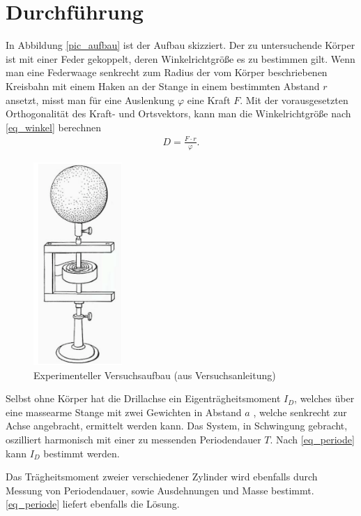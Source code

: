 \section{Durchführung}
In Abbildung \eqref{pic_aufbau} ist der Aufbau skizziert. Der zu untersuchende Körper ist mit einer Feder gekoppelt, deren Winkelrichtgröße
es zu bestimmen gilt. Wenn man eine Federwaage senkrecht zum Radius der vom Körper beschriebenen Kreisbahn mit einem Haken an der Stange
in einem bestimmten Abstand $r$ ansetzt, misst man für eine Auslenkung $\varphi$ eine Kraft $F$. Mit der vorausgesetzten Orthogonalität
des Kraft- und Ortsvektors, kann man die Winkelrichtgröße nach \eqref{eq_winkel} berechnen
\begin{align}
 D = \frac{F\cdot r}{\varphi}.
\end{align}

\begin{figure}[H]
 \includegraphics[width=0.3\textwidth]{pics/aufbau.png}
 \caption{Experimenteller Versuchsaufbau (aus Versuchsanleitung)}
 \label{pic_aufbau}
\end{figure}

Selbst ohne Körper hat die Drillachse ein Eigenträgheitsmoment $I_D$, welches über eine massearme Stange mit zwei Gewichten in Abstand $a$
, welche senkrecht zur Achse angebracht, ermittelt werden kann. Das System, in Schwingung gebracht, oszilliert harmonisch mit einer 
zu messenden Periodendauer $T$. Nach \eqref{eq_periode} kann $I_D$ bestimmt werden.

Das Trägheitsmoment zweier verschiedener Zylinder wird ebenfalls durch Messung von Periodendauer, sowie Ausdehnungen und Masse bestimmt.
\eqref{eq_periode} liefert ebenfalls die Lösung.

